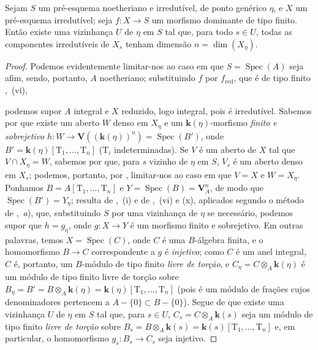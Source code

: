 \begin{corollary}[9.5.6]
\label{IV.9.5.6}
Sejam $S$ um pré-esquema noetheriano e irredutível, de ponto genérico $\eta$, e $X$ um pré-esquema irredutível; seja $f:X\to S$ um morfismo dominante de tipo finito.
Então existe uma vizinhança $U$ de $\eta$ em $S$ tal que, para todo $s\in U$, todas as componentes irredutíveis de $X_s$ tenham dimensão $n=\dim(X_\eta)$.
\end{corollary}

\begin{proof}
Podemos evidentemente limitar-nos ao caso em que $S=\operatorname{Spec}(A)$ seja afim, sendo, portanto, $A$ noetheriano; substituindo $f$ por $f_{\mathrm{red}}$, que é de tipo finito ,~(vi),


podemos supor $A$ integral e $X$ reduzido, logo integral, pois é irredutível.
Sabemos por  que existe um aberto $W$ denso em $X_\eta$ e um $\boldsymbol{k}(\eta)$-morfismo \emph{finito e sobrejetivo} $h:W\to\mathbf{V}((\boldsymbol{k}(\eta))^n)=\operatorname{Spec}(B')$, onde $B'=\boldsymbol{k}(\eta)[\mathrm{T}_1,\ldots,\mathrm{T}_n]$ \textnormal{(}$\mathrm{T}_i$ indeterminadas\textnormal{)}.
Se $V$ é um aberto de $X$ tal que $V\cap X_\eta=W$, sabemos por  que, para $s$ vizinho de $\eta$ em $S$, $V_s$ é um aberto denso em $X_s$; podemos, portanto, por , limitar-nos ao caso em que $V=X$ e $W=X_\eta$.
Ponhamos $B=A[\mathrm{T}_1,\ldots,\mathrm{T}_n]$ e $Y=\operatorname{Spec}(B)=\mathbf{V}_A^n$, de modo que $\operatorname{Spec}(B')=Y_\eta$; resulta de ,~(i) e de ,~(vi) e (x), aplicados segundo o método de ,~\emph{a}), que, substituindo $S$ por uma vizinhança de $\eta$ se necessário, podemos supor que $h=g_\eta$, onde $g:X\to Y$ é um morfismo finito e sobrejetivo.
Em outras palavras, temos $X=\operatorname{Spec}(C)$, onde $C$ é uma $B$-álgebra finita, e o homomorfismo $B\to C$ correspondente a $g$ é \emph{injetivo}; como $C$ é um anel integral, $C$ é, portanto, um $B$-módulo de tipo finito \emph{livre de torção}, e $C_\eta=C\otimes_A\boldsymbol{k}(\eta)$ é um módulo de tipo finito livre de torção sobre $B_\eta=B'=B\otimes_A\boldsymbol{k}(\eta)=\boldsymbol{k}(\eta)[\mathrm{T}_1,\ldots,\mathrm{T}_n]$ \textnormal{(}pois é um módulo de frações cujos denominadores pertencem a $A-\{0\}\subset B-\{0\}$\textnormal{)}.
Segue de  que existe uma vizinhança $U$ de $\eta$ em $S$ tal que, para $s\in U$, $C_s=C\otimes_A\boldsymbol{k}(s)$ seja um módulo de tipo finito \emph{livre de torção} sobre $B_s=B\otimes_A\boldsymbol{k}(s)=\boldsymbol{k}(s)[\mathrm{T}_1,\ldots,\mathrm{T}_n]$ e, em particular, o homomorfismo $g_s:B_s\to C_s$ seja injetivo.

\end{proof}
